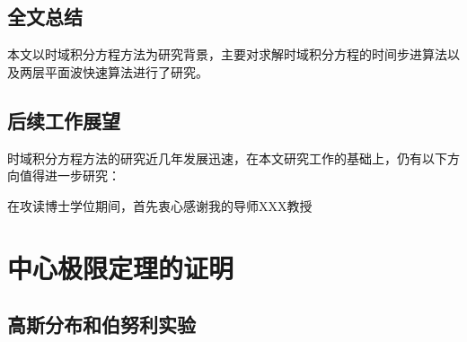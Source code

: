 \documentclass[master]{thesis-uestc}
\begin{document}
\section{全文总结}
本文以时域积分方程方法为研究背景，主要对求解时域积分方程的时间步进算法以及两层平面波快速算法进行了研究。

\section{后续工作展望}
时域积分方程方法的研究近几年发展迅速，在本文研究工作的基础上，仍有以下方向值得进一步研究：

\thesisacknowledgement
在攻读博士学位期间，首先衷心感谢我的导师XXX教授

\thesisappendix

\chapter{中心极限定理的证明}

\section{高斯分布和伯努利实验}




%
% 
%
% 
% 
%

\end{document}
